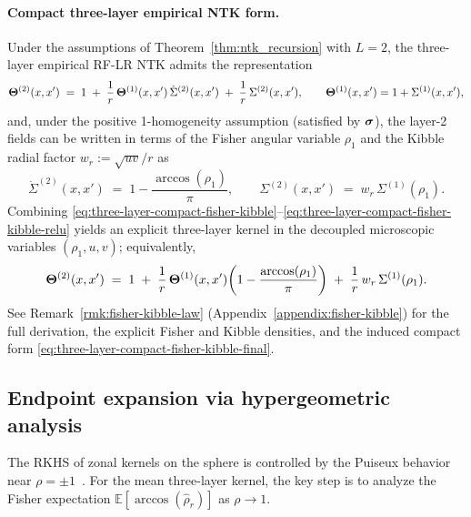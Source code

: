 \paragraph{Compact three-layer empirical NTK form.}
Under the assumptions of Theorem~\ref{thm:ntk_recursion} with \(L=2\), the three-layer empirical RF-LR NTK admits the representation
\begin{equation}\label{eq:three-layer-compact-fisher-kibble}
\boldsymbol{\Theta}^{(2)}(x,x')
\;=\;
1
\;+\;
\frac{1}{r}\,\boldsymbol{\Theta}^{(1)}(x,x')\,\dot{\Sigma}^{(2)}(x,x')
\;+\;
\frac{1}{r}\,\Sigma^{(2)}(x,x'),
\qquad
\boldsymbol{\Theta}^{(1)}(x,x')=1+\Sigma^{(1)}(x,x'),
\end{equation}
and, under the positive 1-homogeneity assumption (satisfied by \(\mathrel{\boldsymbol{\sigma}}\)), the layer-2 fields can be written in terms of the Fisher angular variable \( \rho_1 \) and the Kibble radial factor \( w_r := \sqrt{uv}/r \) as
\begin{equation}\label{eq:three-layer-compact-fisher-kibble-relu}
\dot{\Sigma}^{(2)}(x,x')
\;=\;
1-\frac{\arccos(\rho_1)}{\pi},
\qquad
\Sigma^{(2)}(x,x')
\;=\;
w_r\,\Sigma^{(1)}(\rho_1).
\end{equation}
Combining \eqref{eq:three-layer-compact-fisher-kibble}--\eqref{eq:three-layer-compact-fisher-kibble-relu} yields an explicit three-layer kernel in the decoupled microscopic variables \((\rho_1,u,v)\); equivalently,
\begin{equation}\label{eq:three-layer-compact-fisher-kibble-final}
\boldsymbol{\Theta}^{(2)}(x,x')
\;=\;
1
\;+\;\frac{1}{r}\,\boldsymbol{\Theta}^{(1)}(x,x')\!\left(1-\frac{\arccos(\rho_1)}{\pi}\right)
\;+\;\frac{1}{r}\,w_r\,\Sigma^{(1)}(\rho_1).
\end{equation}
See Remark~\ref{rmk:fisher-kibble-law} (Appendix~\ref{appendix:fisher-kibble}) for the full derivation, the explicit Fisher and Kibble densities, and the induced compact form \eqref{eq:three-layer-compact-fisher-kibble-final}.

\subsection{Endpoint expansion via hypergeometric analysis}\label{subsec:rkhs-hypergeom}
The RKHS of zonal kernels on the sphere is controlled by the Puiseux behavior near \(\rho=\pm 1\)~\cite{bietti2021deepequalsshallowrelu}. For the mean three-layer kernel, the key step is to analyze the Fisher expectation \(\mathbb{E}[\arccos(\hat{\rho}_r)]\) as \(\rho\to 1\).

